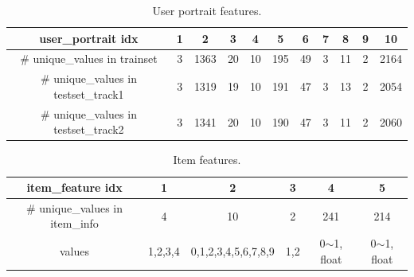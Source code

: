 \begin{table}[t!]
    \centering
    \caption{User portrait features.}
    \begin{tabular}{c|c|c|c|c|c|c|c|c|c|c}
    \hline
    {\color[HTML]{333333} \textbf{user\_portrait idx}} & 1 & {\color[HTML]{333333} \textbf{2}} & {\color[HTML]{333333} \textbf{3}} & {\color[HTML]{333333} \textbf{4}} & {\color[HTML]{333333} \textbf{5}} & {\color[HTML]{333333} \textbf{6}} & {\color[HTML]{333333} \textbf{7}} & {\color[HTML]{333333} \textbf{8}} & {\color[HTML]{333333} \textbf{9}} & {\color[HTML]{333333} \textbf{10}} \\ \hline
    {\color[HTML]{333333} \# unique\_values in trainset} & 3 & {\color[HTML]{333333} 1363} & {\color[HTML]{333333} 20} & {\color[HTML]{333333} 10} & {\color[HTML]{333333} 195} & {\color[HTML]{333333} 49} & {\color[HTML]{333333} 3} & {\color[HTML]{333333} 11} & {\color[HTML]{333333} 2} & {\color[HTML]{333333} 2164} \\ \hline
    {\color[HTML]{333333} \# unique\_values in testset\_track1} & 3 & {\color[HTML]{333333} 1319} & {\color[HTML]{333333} 19} & {\color[HTML]{333333} 10} & {\color[HTML]{333333} 191} & {\color[HTML]{333333} 47} & {\color[HTML]{333333} 3} & {\color[HTML]{333333} 13} & {\color[HTML]{333333} 2} & {\color[HTML]{333333} 2054} \\ \hline
    {\color[HTML]{333333} \# unique\_values in testset\_track2} & 3 & {\color[HTML]{333333} 1341} & {\color[HTML]{333333} 20} & {\color[HTML]{333333} 10} & {\color[HTML]{333333} 190} & {\color[HTML]{333333} 47} & {\color[HTML]{333333} 3} & {\color[HTML]{333333} 11} & {\color[HTML]{333333} 2} & {\color[HTML]{333333} 2060} \\ \hline
    \end{tabular}
    \label{tab:user_portrait}
\end{table}



\begin{table}[t!]
    \centering
    \caption{Item features.}
    \begin{tabular}{c|c|c|c|c|c}
    \hline
    {\color[HTML]{333333} \textbf{item\_feature idx}} & {\color[HTML]{333333} \textbf{1}} & {\color[HTML]{333333} \textbf{2}} & {\color[HTML]{333333} \textbf{3}} & {\color[HTML]{333333} \textbf{4}} & {\color[HTML]{333333} \textbf{5}} \\ \hline
    {\color[HTML]{333333} \# unique\_values in item\_info} & {\color[HTML]{333333} 4} & {\color[HTML]{333333} 10} & {\color[HTML]{333333} 2} & {\color[HTML]{333333} 241} & {\color[HTML]{333333} 214} \\ \hline
    {\color[HTML]{333333} values} & {\color[HTML]{333333} 1,2,3,4} & {\color[HTML]{333333} 0,1,2,3,4,5,6,7,8,9} & {\color[HTML]{333333} 1,2} & {\color[HTML]{333333} 0$\sim$1, float} & {\color[HTML]{333333} 0$\sim$1, float} \\ \hline
    \end{tabular}
    \label{tab:item_features}
\end{table}



